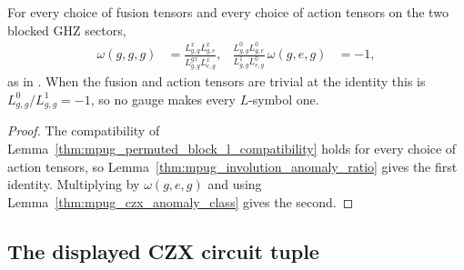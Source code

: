 \begin{lemma}
    \label{thm:mpug_czx_l_symbol_ratio}
    \leanok
    For every choice of fusion tensors and every choice of action tensors on
    the two blocked GHZ sectors,
    \begin{align}
        \omega(g,g,g)
         & =\frac{L^x_{g,g}L^x_{g,e}}{L^{gx}_{g,g}L^x_{e,g}},
         &
        \frac{L^0_{g,g}L^0_{g,e}}{L^1_{g,g}L^0_{e,g}}\,\omega(g,e,g)
         & =-1,
    \end{align}
    as in \cite[line~5121]{FrancoRubio2025MPUGauging}. When the fusion and
    action tensors are trivial at the identity this is
    $L^0_{g,g}/L^1_{g,g}=-1$, so no gauge makes every $L$-symbol one.
\end{lemma}

\begin{proof}\leanok
    The compatibility of
    Lemma~\ref{thm:mpug_permuted_block_l_compatibility} holds for every choice
    of action tensors, so Lemma~\ref{thm:mpug_involution_anomaly_ratio} gives
    the first identity. Multiplying by $\omega(g,e,g)$ and using
    Lemma~\ref{thm:mpug_czx_anomaly_class} gives the second.
\end{proof}

\subsection{The displayed CZX circuit tuple}

